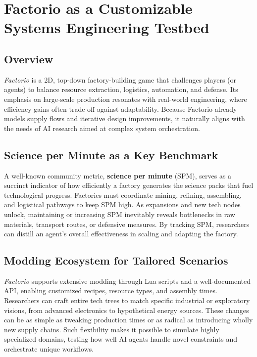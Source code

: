\section{Factorio as a Customizable Systems Engineering Testbed}

\subsection{Overview}
\textit{Factorio} is a 2D, top-down factory-building game that challenges players (or agents) to balance resource extraction, logistics, automation, and defense. Its emphasis on large-scale production resonates with real-world engineering, where efficiency gains often trade off against adaptability. Because Factorio already models supply flows and iterative design improvements, it naturally aligns with the needs of AI research aimed at complex system orchestration.

\subsection{Science per Minute as a Key Benchmark}
A well-known community metric, \textbf{science per minute} (SPM), serves as a succinct indicator of how efficiently a factory generates the science packs that fuel technological progress. Factories must coordinate mining, refining, assembling, and logistical pathways to keep SPM high. As expansions and new tech nodes unlock, maintaining or increasing SPM inevitably reveals bottlenecks in raw materials, transport routes, or defensive measures. By tracking SPM, researchers can distill an agent’s overall effectiveness in scaling and adapting the factory.

\subsection{Modding Ecosystem for Tailored Scenarios}
\textit{Factorio} supports extensive modding through Lua scripts and a well-documented API, enabling customized recipes, resource types, and assembly times. Researchers can craft entire tech trees to match specific industrial or exploratory visions, from advanced electronics to hypothetical energy sources. These changes can be as simple as tweaking production times or as radical as introducing wholly new supply chains. Such flexibility makes it possible to simulate highly specialized domains, testing how well AI agents handle novel constraints and orchestrate unique workflows.


